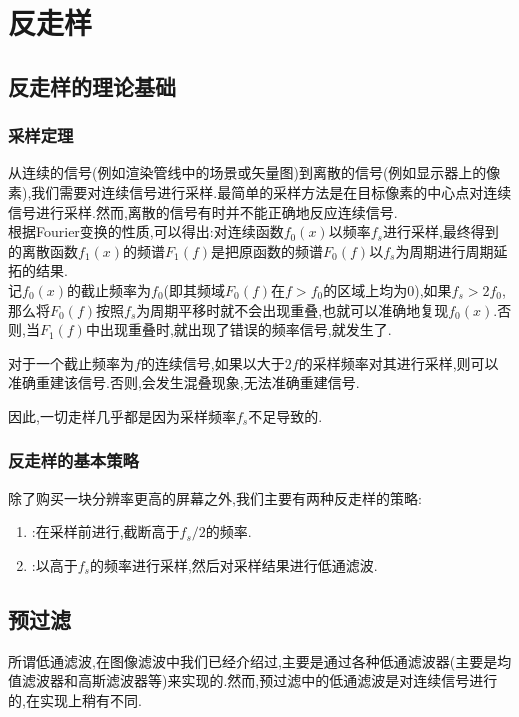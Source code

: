 \documentclass{ctexart}
\begin{document}
\section{反走样}
\subsection{反走样的理论基础}
\subsubsection{采样定理}
从连续的信号(例如渲染管线中的场景或矢量图)到离散的信号(例如显示器上的像素),我们需要对连续信号进行采样.最简单的采样方法是在目标像素的中心点对连续信号进行采样.然而,离散的信号有时并不能正确地反应连续信号.\\
\indent 根据Fourier变换的性质,可以得出:对连续函数$f_0(x)$以频率$f_s$进行采样,最终得到的离散函数$f_1(x)$的频谱$F_1(f)$是把原函数的频谱$F_0(f)$以$f_s$为周期进行周期延拓的结果.\\
\indent 记$f_0(x)$的截止频率为$f_0$(即其频域$F_0(f)$在$f>f_0$的区域上均为$0$),如果$f_s>2f_0$,那么将$F_0(f)$按照$f_s$为周期平移时就不会出现重叠,也就可以准确地复现$f_0(x)$.否则,当$F_1(f)$中出现重叠时,就出现了错误的频率信号,就发生了.
\begin{theorem}
    对于一个截止频率为$f$的连续信号,如果以大于$2f$的采样频率对其进行采样,则可以准确重建该信号.否则,会发生混叠现象,无法准确重建信号.
\end{theorem}
因此,一切走样几乎都是因为采样频率$f_s$不足导致的.
\subsubsection{反走样的基本策略}
除了购买一块分辨率更高的屏幕之外,我们主要有两种反走样的策略:
\begin{enumerate}[label=\tbf{\arabic*}.,topsep=0pt,parsep=0pt,itemsep=0pt,partopsep=0pt]
    \item {}:在采样前进行,截断高于$f_s/2$的频率.
    \item {}:以高于$f_s$的频率进行采样,然后对采样结果进行低通滤波.
\end{enumerate}
\subsection{预过滤}
所谓低通滤波,在图像滤波中我们已经介绍过,主要是通过各种低通滤波器(主要是均值滤波器和高斯滤波器等)来实现的.然而,预过滤中的低通滤波是对连续信号进行的,在实现上稍有不同.
\end{document}

